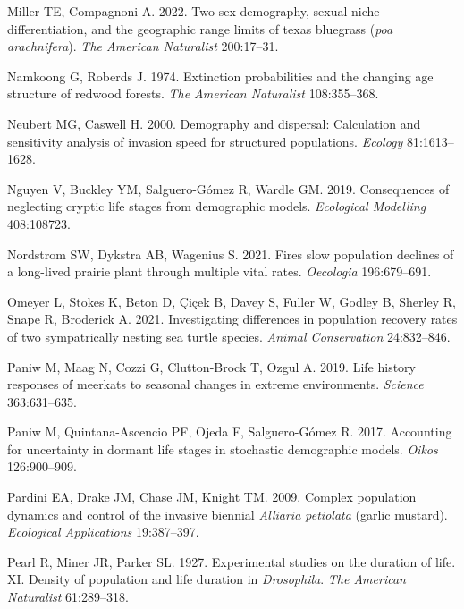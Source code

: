 \documentclass[
  12pt,
  letterpaper,
]{book}
\newlength{\cslhangindent}
\newenvironment{CSLReferences}[2] %
 {\begin{list}{}{%
  \setlength{\itemindent}{0pt}
  \setlength{\leftmargin}{0pt}
  \setlength{\parsep}{0pt}
  \ifodd #1
   \setlength{\leftmargin}{\cslhangindent}
   \setlength{\itemindent}{-1\cslhangindent}
  \fi
  \setlength{\itemsep}{#2\baselineskip}}}
 {\end{list}}
\begin{document}
\begin{CSLReferences}{1}{0}
Miller TE, Compagnoni A. 2022. Two-sex demography, sexual niche
differentiation, and the geographic range limits of texas bluegrass
(\emph{poa {a}rachnifera}). \emph{The American Naturalist} 200:17--31.

Namkoong G, Roberds J. 1974. Extinction probabilities and the changing
age structure of redwood forests. \emph{The American Naturalist}
108:355--368.

Neubert MG, Caswell H. 2000. Demography and dispersal: Calculation and
sensitivity analysis of invasion speed for structured populations.
\emph{Ecology} 81:1613--1628.

Nguyen V, Buckley YM, Salguero-Gómez R, Wardle GM. 2019. Consequences of
neglecting cryptic life stages from demographic models. \emph{Ecological
Modelling} 408:108723.

Nordstrom SW, Dykstra AB, Wagenius S. 2021. Fires slow population
declines of a long-lived prairie plant through multiple vital rates.
\emph{Oecologia} 196:679--691.

Omeyer L, Stokes K, Beton D, Çiçek B, Davey S, Fuller W, Godley B,
Sherley R, Snape R, Broderick A. 2021. Investigating differences in
population recovery rates of two sympatrically nesting sea turtle
species. \emph{Animal Conservation} 24:832--846.

Paniw M, Maag N, Cozzi G, Clutton-Brock T, Ozgul A. 2019. Life history
responses of meerkats to seasonal changes in extreme environments.
\emph{Science} 363:631--635.

Paniw M, Quintana-Ascencio PF, Ojeda F, Salguero-Gómez R. 2017.
Accounting for uncertainty in dormant life stages in stochastic
demographic models. \emph{Oikos} 126:900--909.

Pardini EA, Drake JM, Chase JM, Knight TM. 2009. Complex population
dynamics and control of the invasive biennial \emph{{A}lliaria
{p}etiolata} (garlic mustard). \emph{Ecological Applications}
19:387--397.

Pearl R, Miner JR, Parker SL. 1927. Experimental studies on the duration
of life. XI. Density of population and life duration in
\emph{{D}rosophila}. \emph{The American Naturalist} 61:289--318.


\end{CSLReferences}
\end{document}

